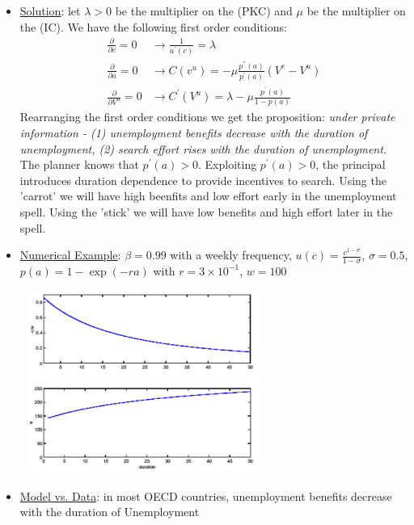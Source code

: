 \documentclass{article}
\begin{document}
\begin{itemize}
    \item  \underline{Solution}: let $\lambda > 0$ be the multiplier on the (PKC) and $\mu$ be the multiplier on the (IC). We have the following first order conditions:
    \begin{align*}
        \frac{\partial}{\partial c} = 0 &\rightarrow \frac{1}{u^{'}(c)} = \lambda \tag{1} \\
        \frac{\partial}{\partial a} = 0 &\rightarrow C(v^{u}) = -\mu \frac{p^{''}(a)}{p^{'}(a)} (V^{e} - V^{u}) \\
        \frac{\partial}{\partial V^{u}} = 0 &\rightarrow C^{'}(V^{u}) = \lambda - \mu \frac{p^{'}(a)}{1 - p(a)}
    \end{align*}
    Rearranging the first order conditions we get the proposition: \textit{under private information - (1) unemployment benefits decrease with the duration of unemployment, (2) search effort rises with the duration of unemployment}.
    The planner knows that $p^{'}(a) > 0$. Exploiting $p^{'}(a) > 0$, the principal introduces duration dependence to provide incentives to search. Using the 'carrot' we will have high beenfits and low effort early in the unemployment spell. Using the 'stick' we will have low benefits and high effort later in the spell.
    \item  \underline{Numerical Example}: $\beta = 0.99$ with a weekly frequency, $u(c) = \frac{c^{1-\sigma}}{1 - \sigma}$, $\sigma = 0.5$, $p(a) = 1 - \exp(-ra)$ with $r = 3 \times 10^{-1}$, $w = 100$
    \newline
    \begin{center}
        \includegraphics[width=8cm, height=6cm]{pic26}
    \end{center}
    \item  \underline{Model vs. Data}: in most OECD countries, unemployment benefits decrease with the duration of Unemployment
    \newline

\end{itemize}
\end{document}
